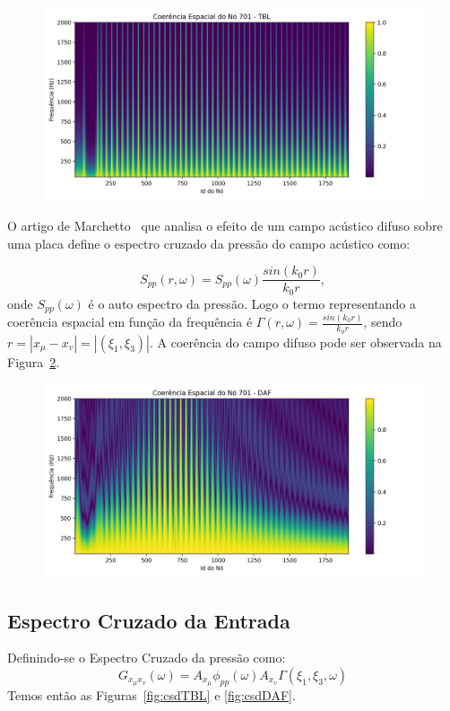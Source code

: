 \documentclass[9pt,a4paper,twoside]{rho-class/rho}
\begin{document}
\begin{figure}[H]
	\centering
	\includegraphics[width=0.9\columnwidth]{figures/coer_TBL.png}
	\caption{}
	\label{fig:coerTBL}
\end{figure}
O artigo de Marchetto~\cite{marchettoVibroacousticResponsePanels2017} que analisa o efeito de um campo acústico difuso sobre uma placa define o espectro cruzado da pressão do campo acústico como:

\begin{equation}
	S_{pp}(r,\omega) = S_{pp}(\omega) \frac{sin(k_0r)}{k_0r},
\end{equation}
onde $S_{pp}(\omega)$ é o auto espectro da pressão. Logo o termo representando a coerência espacial em função da frequência é $\Gamma(r,\omega) = \frac{sin(k_0r)}{k_0r}$, sendo $r = |x_\mu - x_v| = |(\xi_1,\xi_3)|$. A coerência do campo difuso pode ser observada na Figura~\ref{fig:coerDAF}.

\begin{figure}[H]
	\centering
	\includegraphics[width=0.9\columnwidth]{figures/coer_DAF.png}
	\caption{}
	\label{fig:coerDAF}
\end{figure}
\vfill
\subsection{Espectro Cruzado da Entrada}
Definindo-se o Espectro Cruzado da pressão como: 
\begin{equation}
	G_{x_\mu x_v}(\omega)=A_{x_\mu}\phi_{pp}(\omega)A_{x_v}\Gamma(\xi_1,\xi_3,\omega)
\end{equation}
Temos então as Figuras~\ref{fig:csdTBL} e \ref{fig:csdDAF}.
\end{document}
